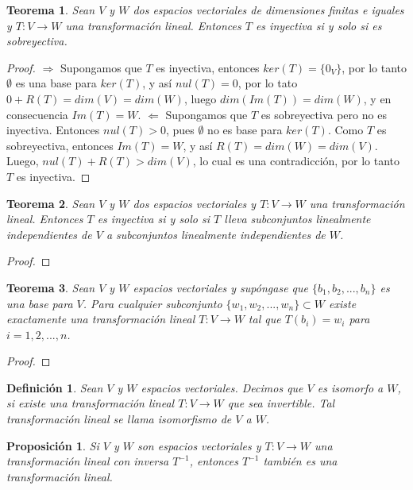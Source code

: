 \documentclass{book}
\newtheorem{theorem}{Teorema}
\newtheorem{proposition}{Proposición}
\newtheorem{definition}{Definición}
\begin{document}
\begin{theorem}
Sean $V$ y $W$ dos espacios vectoriales de dimensiones finitas e iguales y $T:V\rightarrow W$ una transformación lineal. Entonces $T$ es inyectiva si y solo si es sobreyectiva.
\end{theorem}

\begin{proof}
$\Rightarrow$ Supongamos que $T$ es inyectiva, entonces $ker(T)=\{0_V\}$, por lo tanto $\emptyset$ es una base para $ker(T)$, y así $nul(T)=0$, por lo tato $0+R(T)=dim(V)=dim(W)$, luego $dim(Im(T))=dim(W)$, y en consecuencia $Im(T)=W$.\newline 
$\Leftarrow$ Supongamos que $T$ es sobreyectiva pero no es inyectiva. Entonces $nul(T)>0$, pues $\emptyset$ no es base para $ker(T)$. Como $T$ es sobreyectiva, entonces $Im(T)=W$, y así $R(T)=dim(W)=dim(V)$. Luego, $nul(T)+R(T)>dim(V)$, lo cual es una contradicción, por lo tanto $T$ es inyectiva.
\end{proof}

\begin{theorem}
Sean $V$ y $W$ dos espacios vectoriales y $T:V\rightarrow W$ una transformación lineal. Entonces $T$ es inyectiva si y solo si $T$ lleva subconjuntos linealmente independientes de $V$ a subconjuntos linealmente independientes de $W$.
\end{theorem}

\begin{proof}

\end{proof}

\begin{theorem}
Sean $V$ y $W$ espacios vectoriales y supóngase que $\{b_1,b_2,...,b_n\}$ es una base para $V$. Para cualquier subconjunto $\{w_1,w_2,...,w_n\}\subset W$ existe exactamente una transformación lineal $T:V\rightarrow W$ tal que $T(b_i)=w_i$ para $i=1,2,...,n$.
\end{theorem}

\begin{proof}

\end{proof}

\begin{definition}
Sean $V$ y $W$ espacios vectoriales. Decimos que $V$ es isomorfo a $W$, si existe una transformación lineal $T:V \rightarrow W$ que sea invertible. Tal transformación lineal se llama isomorfismo de $V$ a $W$.
\end{definition}

\begin{proposition}
Si $V$ y $W$ son espacios vectoriales y $T:V\rightarrow W$ una transformación lineal con inversa $T^{-1}$, entonces $T^{-1}$ también es una transformación lineal.
\end{proposition}
\end{document}
